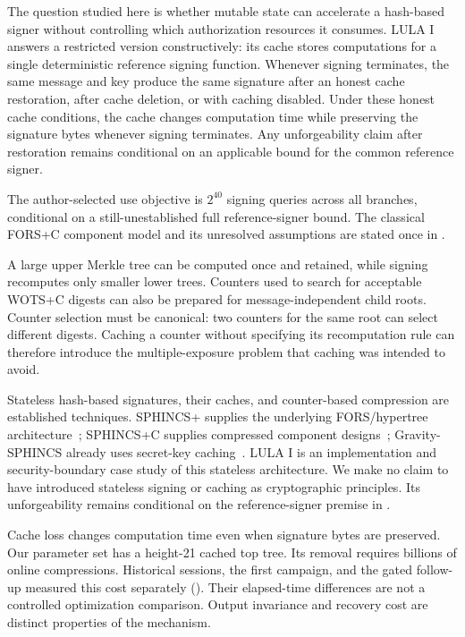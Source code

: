 \documentclass[a4paper,envcountsame,runningheads]{llncs}
\begin{document}
The question studied here is whether mutable state can accelerate a hash-based signer without controlling which authorization resources it consumes. LULA I answers a restricted version constructively: its cache stores computations for a single deterministic reference signing function. Whenever signing terminates, the same message and key produce the same signature after an honest cache restoration, after cache deletion, or with caching disabled. Under these honest cache conditions, the cache changes computation time while preserving the signature bytes whenever signing terminates. Any unforgeability claim after restoration remains conditional on an applicable bound for the common reference signer.

The author-selected use objective is $2^{40}$ signing queries across all branches, conditional on a still-unestablished full reference-signer bound. The classical FORS+C component model and its unresolved assumptions are stated once in .

A large upper Merkle tree can be computed once and retained, while signing recomputes only smaller lower trees. Counters used to search for acceptable WOTS+C digests can also be prepared for message-independent child roots. Counter selection must be canonical: two counters for the same root can select different digests. Caching a counter without specifying its recomputation rule can therefore introduce the multiple-exposure problem that caching was intended to avoid.

Stateless hash-based signatures, their caches, and counter-based compression are established techniques. SPHINCS+ supplies the underlying FORS/hypertree architecture~\cite{sphincs}; SPHINCS+C supplies compressed component designs~\cite{sphincsc}; Gravity-SPHINCS already uses secret-key caching~\cite{gravity}. LULA I is an implementation and security-boundary case study of this stateless architecture. We make no claim to have introduced stateless signing or caching as cryptographic principles. Its unforgeability remains conditional on the reference-signer premise in .

Cache loss changes computation time even when signature bytes are preserved. Our parameter set has a height-21 cached top tree. Its removal requires billions of online compressions. Historical sessions, the first campaign, and the gated follow-up measured this cost separately (). Their elapsed-time differences are not a controlled optimization comparison. Output invariance and recovery cost are distinct properties of the mechanism.
\end{document}
